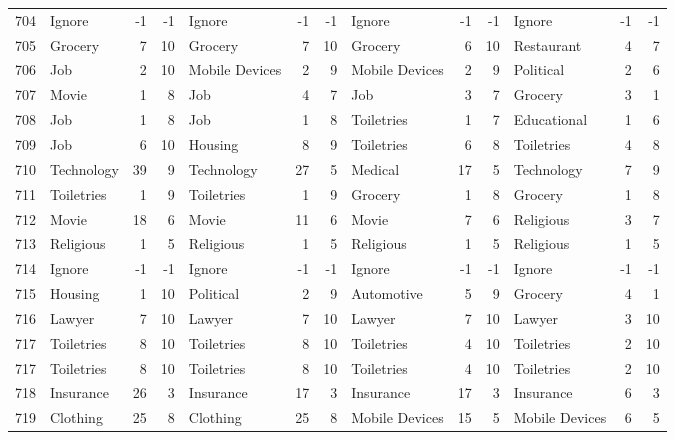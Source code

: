 \begin{figure}[htbp]
\begin{tabular}{rlrrlrrlrrlrr}
    704   & Ignore & -1    & -1    & Ignore & -1    & -1    & Ignore & -1    & -1    & Ignore & -1    & -1 \\
    705   & Grocery & 7     & 10    & Grocery & 7     & 10    & Grocery & 6     & 10    & Restaurant & 4     & 7 \\
    706   & Job   & 2     & 10    & Mobile Devices & 2     & 9     & Mobile Devices & 2     & 9     & Political & 2     & 6 \\
    707   & Movie & 1     & 8     & Job   & 4     & 7     & Job   & 3     & 7     & Grocery & 3     & 1 \\
    708   & Job   & 1     & 8     & Job   & 1     & 8     & Toiletries & 1     & 7     & Educational & 1     & 6 \\
    709   & Job   & 6     & 10    & Housing & 8     & 9     & Toiletries & 6     & 8     & Toiletries & 4     & 8 \\
    710   & Technology & 39    & 9     & Technology & 27    & 5     & Medical & 17    & 5     & Technology & 7     & 9 \\
    711   & Toiletries & 1     & 9     & Toiletries & 1     & 9     & Grocery & 1     & 8     & Grocery & 1     & 8 \\
    712   & Movie & 18    & 6     & Movie & 11    & 6     & Movie & 7     & 6     & Religious & 3     & 7 \\
    713   & Religious & 1     & 5     & Religious & 1     & 5     & Religious & 1     & 5     & Religious & 1     & 5 \\
    714   & Ignore & -1    & -1    & Ignore & -1    & -1    & Ignore & -1    & -1    & Ignore & -1    & -1 \\
    715   & Housing & 1     & 10    & Political & 2     & 9     & Automotive & 5     & 9     & Grocery & 4     & 1 \\
    716   & Lawyer & 7     & 10    & Lawyer & 7     & 10    & Lawyer & 7     & 10    & Lawyer & 3     & 10 \\
    717   & Toiletries & 8     & 10    & Toiletries & 8     & 10    & Toiletries & 4     & 10    & Toiletries & 2     & 10 \\
    717   & Toiletries & 8     & 10    & Toiletries & 8     & 10    & Toiletries & 4     & 10    & Toiletries & 2     & 10 \\
    718   & Insurance & 26    & 3     & Insurance & 17    & 3     & Insurance & 17    & 3     & Insurance & 6     & 3 \\
    719   & Clothing & 25    & 8     & Clothing & 25    & 8     & Mobile Devices & 15    & 5     & Mobile Devices & 6     & 5 \\

\end{tabular}
\end{figure}
